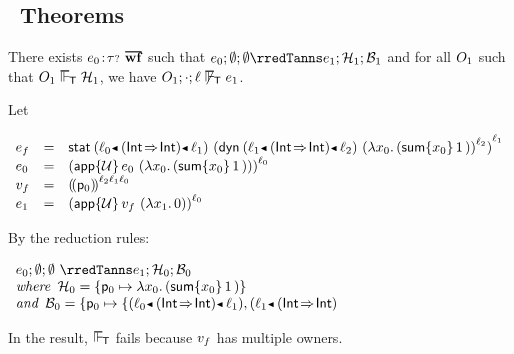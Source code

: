 \subsection{\Tname{}\ Theorems}

\begin{theorem}\label{T-incomplete-monitoring}
  There exists\/ $\fwellformedO{\sexpr_0}{\stoptional}$
  such that\/ $\conf{\sexpr_0}{\semptymap}{\semptymap} \rredTanns \conf{\sexpr_1}{\vstore_1}{\bstore_1}$
  and for all\/ $O_1$
  such that\/ $\lstore_1 \sWSOT \vstore_1$,
  we have\/ $\lstore_1; \cdot; \sowner \not \sWSOT \sexpr_1$.
\end{theorem}
\begin{lamportproof}
{\newcommand{\thetype}{(\tfun{\tint}{\tint})}
 \newcommand{\thefun}{\efun{\svar_0}{(\esum{\svar_0}{1})}}
 \newcommand{\theargval}{\efun{\svar_1}{0}}
 \newcommand{\theexprA}{\estab{\obnd{\sowner_0}{\thetype}{\sowner_1}}{\obars{\edynb{\obnd{\sowner_1}{\thetype}{\sowner_2}}{\obars{\thefun}{\sowner_2}}}{\sowner_1}}}
  \newcommand{\theexprB}{\obars{\eapp{\tdyn}{\sexpr_0}{(\thefun)}}{\sowner_0}}

  Let\/

  $\begin{array}{lll}
   \sexpr_f & \eeq & \theexprA\\
    \sexpr_0 & \eeq & \theexprB \\
    \svalue_f & \eeq & {\obbars{\eloc_0}{\fconcat{\sowner_2}{\fconcat{\sowner_1}{\sowner_0}}}}\\
    \sexpr_1 & \eeq &
    \obars{\eapp{\tdyn}{\svalue_f}{(\theargval)}}{\sowner_0} 
  \end{array}$
  \smallskip

  By the reduction rules:

  \(\begin{array}[t]{l@{~}l}
    \conf{\sexpr_0}{\semptymap}{\semptymap}
    & \rredTanns  \conf{\sexpr_1}{\vstore_0}{\bstore_0}
    \\
    \zerowidth{\mbox{\it where\, $\vstore_0 \eeq \eset{\vrecord{\eloc_0}{\thefun}}$}}
    \\
    \zerowidth{\mbox{\it and\, $\bstore_0 \eeq \eset{\brecord{\eloc_0}{\eset{{\obnd{\sowner_0}{\thetype}{\sowner_1}},{\obnd{\sowner_1}{\thetype}{\sowner_2}}}}}$}}
  \end{array}\)

  In the result, $\sWSOT$ fails because $v_f$ has multiple owners.
  }
\end{lamportproof}

